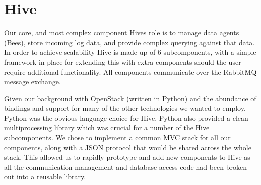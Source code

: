 \section{Hive}

Our core, and most complex component Hives role is to manage data agents (Bees),
store incoming log data, and provide complex querying against that data. In
order to achieve scalability Hive is made up of 6 subcomponents, with a simple
framework in place for extending this with extra components should the user
require additional functionality. All components communicate over the RabbitMQ
message exchange.

Given our background with OpenStack\cite{os} (written in Python) and the abundance of
bindings and support for many of the other technologies we wanted to employ,
Python was the obvious language choice for Hive. Python also provided a clean
multiprocessing library which was crucial for a number of the Hive
subcomponents. We chose to implement a common MVC stack for all our components,
along with a JSON protocol that would be shared across the whole stack. This
allowed us to rapidly prototype and add new components to Hive as all the
communication management and database access code had been broken out into a
reusable library.
